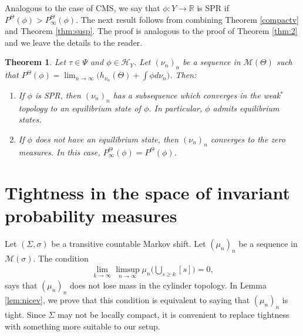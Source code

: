 \documentclass[letterpaper,11pt]{amsart}
\theoremstyle{plain}
\newtheorem{theorem}{Theorem}[section]
\theoremstyle{plain}
\theoremstyle{definition}
\theoremstyle{remark}
\def\R{{\mathbb R}}
\def\M{{\mathcal M}}
\def\H{{\mathcal H}}
\begin{document}
Analogous to the case of CMS, we say that $\phi:Y\to\R$ is SPR if  $P^\Theta(\phi)>P_\infty^\Theta(\phi)$.  The next result follows from combining  Theorem \ref{compactv} and Theorem \ref{thm:susp}. The proof is analogous to the proof of Theorem \ref{thm:2} and we leave the details to the reader. 

\begin{theorem}\label{fine:sus} Let $\tau\in \Psi$ and $\phi\in \H_Y$. Let $(\nu_n)_n$ be a sequence in $\M(\Theta)$ such that  $P^\Theta(\phi)=\lim_{n\to\infty} \big( h_{\nu_n}(\Theta)+\int \phi d\nu_n\big)$. Then:
\begin{enumerate}
\item If $\phi$ is SPR, then $(\nu_n)_n$ has a subsequence which converges in the weak$^*$ topology to an equilibrium state of $\phi$. In particular, $\phi$ admits equilibrium states.
\item If $\phi$ does not have an equilibrium state, then $(\nu_n)_n$ converges to the zero measures. In this case, $P_\infty^\Theta(\phi)=P^\Theta(\phi)$.
\end{enumerate}

\end{theorem}








\appendix

\section{Tightness in the space of invariant probability measures}

Let $(\Sigma,\sigma)$ be a transitive countable Markov shift. Let $(\mu_n)_n$ be a sequence in $\M(\sigma)$. The condition
\begin{align}\label{pivale}\lim_{k\to\infty}\limsup_{n\to\infty}\mu_n\big(\bigcup_{s\ge k}[s]\big)=0,\end{align}
says that $(\mu_n)_n$ does not lose mass in the cylinder topology. In Lemma \ref{lem:nicev}, we prove that this condition is equivalent to saying that  $(\mu_n)_n$ is tight. Since $\Sigma$ may not be locally compact, it is convenient to replace tightness with something more suitable to our setup. 
\end{document}
